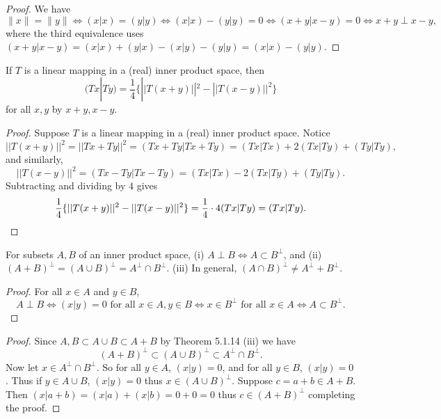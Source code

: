 \begin{proof}
    We have 
    \[\|x\| = \|y\| \iff (x|x) = (y|y) \iff (x|x) - (y|y) = 0 \iff (x+y|x-y) = 0 \iff x+y \perp x-y,\]
    where the third equivalence uses $(x+y|x-y) = (x|x) + (y|x) - (x|y) - (y|y) = (x|x) - (y|y)$.
\end{proof}

\begin{tcolorbox}[title=Problem 9, breakable]
    If $T$ is a linear mapping in a (real) inner product space, then 
    \[(Tx|Ty) = \frac{1}{4}\{||T(x + y)||^2 - ||T(x - y)||^2\}\]
    for all $x, y$ by $x + y, x - y$.
\end{tcolorbox}

\begin{proof}
    Suppose $T$ is a linear mapping in a (real) inner product space.
    Notice 
    \[||T(x + y)||^2 = ||Tx + Ty||^2 = (Tx + Ty | Tx + Ty) = (Tx|Tx) + 2(Tx|Ty) + (Ty|Ty),\]
    and similarly,
    \[||T(x - y)||^2 = (Tx - Ty | Tx - Ty) = (Tx|Tx) - 2(Tx|Ty) + (Ty|Ty).\]
    Subtracting and dividing by $4$ gives
    \[\frac{1}{4}\{||T(x+y)||^2 - ||T(x-y)||^2\} = \frac{1}{4} \cdot 4(Tx|Ty) = (Tx|Ty). \qedhere\]
\end{proof}

\begin{tcolorbox}[title=Problem 10, breakable]
    For subsets $A, B$ of an inner product space, (i) $A \perp B \iff A \subset B^\perp$,
    and (ii) $(A + B)^\perp = (A \cup B)^\perp = A^\perp \cap B^\perp$. (iii) In general,
    $(A \cap B)^\perp \ne A^\perp + B^\perp$.
\end{tcolorbox}

\begin{proof}
    For all $x \in A$ and $y \in B$,
    \[A \perp B \iff (x|y) = 0 \text{ for all } x \in A, y \in B \iff x \in B^\perp \text{ for all } x \in A \iff A \subset B^\perp.\]
\end{proof}

\begin{proof}
    Since $A, B \subset A \cup B \subset A + B$ by Theorem 5.1.14 (iii) we have 
    \[(A + B)^\perp \subset (A \cup B)^\perp \subset A^\perp \cap B^\perp.\]
    Now let $x \in A^\perp \cap B^\perp$. So for all $y \in A$, $(x|y) = 0$, and for all $y \in B$, $(x|y) = 0$.
    Thus if $y \in A \cup B$, $(x|y) = 0$ thus $x \in (A \cup B)^\perp$.
    Suppose $c = a + b \in A + B$. Then $(x|a + b) = (x|a) + (x|b) = 0 + 0 = 0$
        thus $c \in (A + B)^\perp$ completing the proof.
\end{proof}

